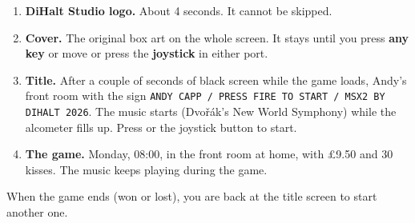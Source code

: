 \begin{enumerate}
\item \textbf{DiHalt Studio logo.} About 4 seconds. It cannot be skipped.
\item \textbf{Cover.} The original box art on the whole screen. It stays until you press \textbf{any key} or move or press the \textbf{joystick} in either port.
\item \textbf{Title.} After a couple of seconds of black screen while the game loads, Andy's front room with the sign \texttt{ANDY CAPP / PRESS FIRE TO START / MSX2 BY DIHALT 2026}. The music starts (Dvo\v{r}\'ak's New World Symphony) while the alcometer fills up. Press  or the joystick button to start.
\item \textbf{The game.} Monday, 08:00, in the front room at home, with \pounds 9.50 and 30 kisses. The music keeps playing during the game.
\end{enumerate}

When the game ends (won or lost), you are back at the title screen to start another one.
